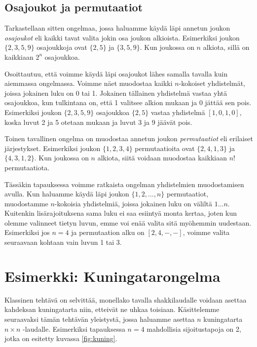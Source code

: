 \subsection{Osajoukot ja permutaatiot}

Tarkastellaan sitten ongelmaa,
jossa haluamme käydä läpi annetun joukon \emph{osajoukot}
eli kaikki tavat valita jokin osa joukon alkioista.
Esimerkiksi joukon $\{2,3,5,9\}$ osajoukkoja ovat
$\{2,5\}$ ja $\{3,5,9\}$.
Kun joukossa on $n$ alkiota, sillä on kaikkiaan $2^n$ osajoukkoa.

Osoittautuu, että voimme käydä läpi osajoukot lähes samalla
tavalla kuin aiemmassa ongelmassa.
Voimme näet muodostaa kaikki $n$-kokoiset yhdistelmät,
joissa jokainen luku on 0 tai 1.
Jokainen tällainen yhdistelmä vastaa yhtä osajoukkoa,
kun tulkintana on, että 1 valitsee alkion mukaan
ja 0 jättää sen pois.
Esimerkiksi joukon $\{2,3,5,9\}$ osajoukkoa $\{2,5\}$
vastaa yhdistelmä $[1,0,1,0]$,
koska luvut 2 ja 5 otetaan mukaan ja luvut 3 ja 9 jäävät pois.

Toinen tavallinen ongelma on muodostaa annetun joukon
\emph{permutaatiot} eli erilaiset järjestykset.
Esimerkiksi joukon $\{1,2,3,4\}$ permutaatioita ovat
$\{2,4,1,3\}$ ja $\{4,3,1,2\}$.
Kun joukossa on $n$ alkiota, siitä voidaan muodostaa
kaikkiaan $n!$ permutaatiota.

Tässäkin tapauksessa voimme ratkaista ongelman yhdistelmien
muodostamisen avulla.
Kun haluamme käydä läpi joukon $\{1,2,\dots,n\}$ permutaatiot,
muodostamme $n$-kokoisia yhdistelmiä, joissa jokainen luku
on väliltä $1 \dots n$.
Kuitenkin lisärajoituksena sama luku ei saa esiintyä monta kertaa,
joten kun olemme valinneet tietyn luvun,
emme voi enää valita sitä myöhemmin uudestaan.
Esimerkiksi jos $n=4$ ja permutaation alku on $[2,4,-,-]$,
voimme valita seuraavaan kohtaan vain luvun 1 tai 3.


\section{Esimerkki: Kuningatarongelma}

Klassinen tehtävä on selvittää,
monellako tavalla shakkilaudalle voidaan asettaa kahdeksan kuningatarta
niin, etteivät ne uhkaa toisiaan.
Käsittelemme seuraavaksi tämän tehtävän yleistystä,
jossa haluamme asettaa $n$ kuningatarta $n \times n$ -laudalle.
Esimerkiksi tapauksessa $n=4$ mahdollisia sijoitustapoja on 2,
jotka on esitetty kuvassa \ref{fig:kuning}.


